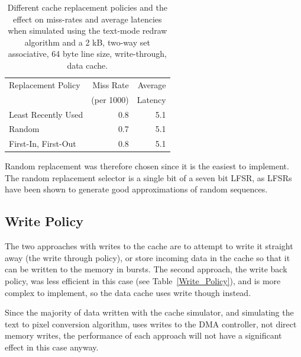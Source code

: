 \begin{table}[h!]
\begin{center}
\begin{tabular}{l r r}
Replacement Policy & Miss Rate & Average \\
 & (per 1000) & Latency \\
\hline
Least Recently Used & 0.8 & 5.1 \\
Random & 0.7 & 5.1 \\
First-In, First-Out & 0.8 & 5.1 \\
\end{tabular}
\caption[Cache eviction policy vs. performance]{Different cache replacement
policies and the effect on miss-rates and average latencies when simulated
using the text-mode redraw algorithm and a 2 kB, two-way set associative, 64
byte line size, write-through, data cache.}
\label{Mem_OpenVGA_Evict_Policy}
\end{center}
\end{table}

Random replacement was therefore chosen since it is the easiest to implement. The
random replacement selector is a single bit of a seven bit LFSR, as LFSRs have
been shown to generate good approximations of random
sequences\cite{dufaza1991lbd}.


\subsection{Write Policy}
The two approaches with writes to the cache are to attempt to write it straight
away (the write through policy), or store incoming data in the cache so that it
can be written to the memory in bursts. The second approach, the write back
policy, was less efficient in this case (see Table~\ref{Write_Policy}), and is
more complex to implement, so the data cache uses write though instead.

Since the majority of data written with the cache simulator, and simulating the
text to pixel conversion algorithm, uses writes to the DMA controller, not direct
memory writes, the performance of each approach will not have a significant
effect in this case anyway.

